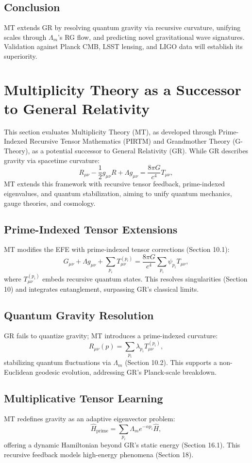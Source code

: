 \documentclass[12]{amsart}
\theoremstyle{plain}
\begin{document}
\subsection{Conclusion}
MT extends GR by resolving quantum gravity via recursive curvature, unifying scales through \(\Lambda_m\)'s RG flow, and predicting novel gravitational wave signatures. Validation against Planck CMB, LSST lensing, and LIGO data will establish its superiority.

\section{Multiplicity Theory as a Successor to General Relativity}
This section evaluates Multiplicity Theory (MT), as developed through Prime-Indexed Recursive Tensor Mathematics (PIRTM) and Grandmother Theory (G-Theory), as a potential successor to General Relativity (GR). While GR describes gravity via spacetime curvature:
\[
R_{\mu \nu} - \frac{1}{2} g_{\mu \nu} R + \Lambda g_{\mu \nu} = \frac{8 \pi G}{c^4} T_{\mu \nu},
\]
MT extends this framework with recursive tensor feedback, prime-indexed eigenvalues, and quantum stabilization, aiming to unify quantum mechanics, gauge theories, and cosmology.

\subsection{Prime-Indexed Tensor Extensions}
MT modifies the EFE with prime-indexed tensor corrections (Section 10.1):
\[
G_{\mu \nu} + \Lambda g_{\mu \nu} + \sum_{p_i} T_{\mu \nu}^{(p_i)} = \frac{8 \pi G}{c^4} \sum_{p_i} \psi_{p_i} T_{\mu \nu},
\]
where \( T_{\mu \nu}^{(p_i)} \) embeds recursive quantum states. This resolves singularities (Section 10) and integrates entanglement, surpassing GR’s classical limits.

\subsection{Quantum Gravity Resolution}
GR fails to quantize gravity; MT introduces a prime-indexed curvature:
\[
R_{\mu \nu}(p) = \sum_{p_i} \lambda_{p_i} T_{\mu \nu}^{(p_i)},
\]
stabilizing quantum fluctuations via \(\Lambda_m\) (Section 10.2). This supports a non-Euclidean geodesic evolution, addressing GR’s Planck-scale breakdown.

\subsection{Multiplicative Tensor Learning}
MT redefines gravity as an adaptive eigenvector problem:
\[
\hat{H}_{\text{prime}} = \sum_{p_i} \Lambda_m e^{-\alpha p_i} \hat{H},
\]
offering a dynamic Hamiltonian beyond GR’s static energy (Section 16.1). This recursive feedback models high-energy phenomena (Section 18).
\end{document}
